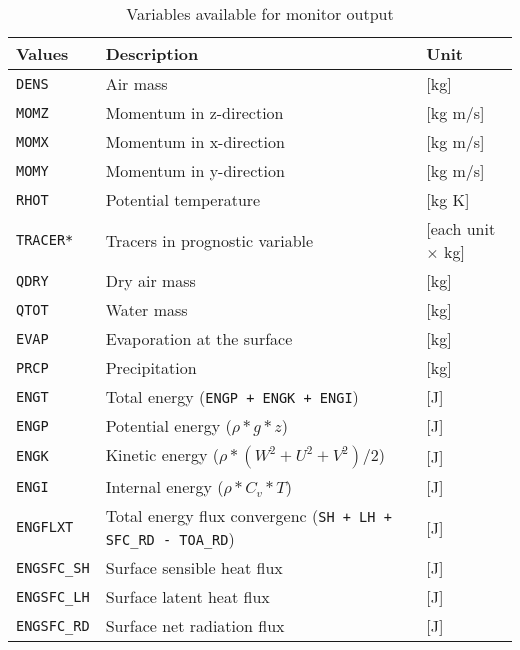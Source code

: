\begin{table}[h]
\begin{center}
  \caption{Variables available for monitor output}
  \label{tab:varlist_monitor}
  \begin{tabularx}{150mm}{|l|X|l|} \hline
    \rowcolor[gray]{0.9}  Values & Description & Unit \\ \hline
      \verb|DENS|         & Air mass                                  & [kg]     \\
      \verb|MOMZ|         & Momentum in z-direction                   & [kg m/s] \\
      \verb|MOMX|         & Momentum in x-direction                   & [kg m/s] \\
      \verb|MOMY|         & Momentum in y-direction                   & [kg m/s] \\
      \verb|RHOT|         & Potential temperature                     & [kg K]   \\
      \verb|TRACER*|      & Tracers in prognostic variable            & [each unit $\times$ kg] \\
      \verb|QDRY|         & Dry air mass                              & [kg] \\
      \verb|QTOT|         & Water mass                                & [kg] \\
      \verb|EVAP|         & Evaporation at the surface                & [kg] \\
      \verb|PRCP|         & Precipitation                             & [kg] \\
      \verb|ENGT|         & Total     energy (\verb|ENGP + ENGK + ENGI|)  & [J] \\
      \verb|ENGP|         & Potential energy ($\rho * g * z$)             & [J] \\
      \verb|ENGK|         & Kinetic   energy ($\rho * (W^2+U^2+V^2) / 2$) & [J] \\
      \verb|ENGI|         & Internal  energy ($\rho * C_v * T$)           & [J] \\
      \verb|ENGFLXT|      & Total energy flux convergenc (\verb|SH + LH + SFC_RD - TOA_RD|) & [J] \\
      \verb|ENGSFC_SH|    & Surface sensible heat flux                & [J] \\
      \verb|ENGSFC_LH|    & Surface latent   heat flux                & [J] \\
      \verb|ENGSFC_RD|    & Surface net radiation flux                & [J] \\

\end{tabularx}
\end{center}
\end{table}
